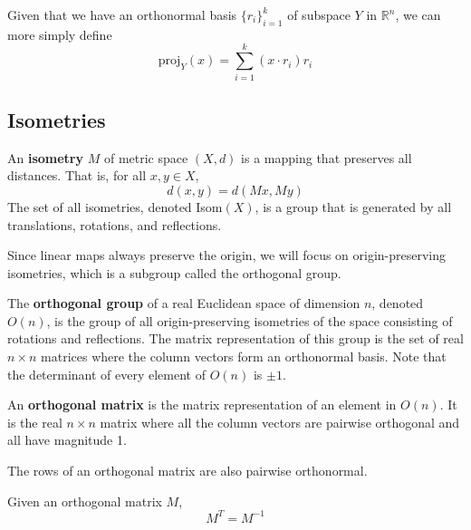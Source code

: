   Given that we have an orthonormal basis $\{r_i\}_{i=1}^k$ of subspace $Y$ in $\mathbb{R}^n$, we can more simply define 
  \begin{equation}
    \text{proj}_Y (x) = \sum_{i=1}^k (x \cdot r_i) r_i
  \end{equation}

\subsection{Isometries}

  \begin{definition}[Isometry]
    An \textbf{isometry} $M$ of metric space $(X, d)$ is a mapping that preserves all distances. That is, for all $x, y \in X$, 
    \begin{equation}
      d(x, y) = d(M x, M y) 
    \end{equation}
    The set of all isometries, denoted Isom$(X)$, is a group that is generated by all translations, rotations, and reflections. 
  \end{definition}

  Since linear maps always preserve the origin, we will focus on origin-preserving isometries, which is a subgroup called the orthogonal group.

  \begin{definition}
    The \textbf{orthogonal group} of a real Euclidean space of dimension $n$, denoted $O(n)$, is the group of all origin-preserving isometries of the space consisting of rotations and reflections. The matrix representation of this group is the set of real $n \times n$ matrices where the column vectors form an orthonormal basis. Note that the determinant of every element of $O(n)$ is $\pm 1$. 
  \end{definition}

  \begin{definition}
    An \textbf{orthogonal matrix} is the matrix representation of an element in $O(n)$. It is the real $n \times n$ matrix where all the column vectors are pairwise orthogonal and all have magnitude 1. 
  \end{definition}

  \begin{theorem}
    The rows of an orthogonal matrix are also pairwise orthonormal.
  \end{theorem}

  \begin{theorem}
    Given an orthogonal matrix $M$,
    \begin{equation}
      M^T = M^{-1}
    \end{equation}
  \end{theorem}

